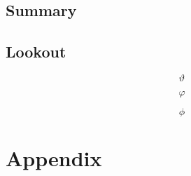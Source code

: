 	\section{Summary}
	\section{Lookout}
	\newpage
	\begin{equation*}
		\vartheta
	\end{equation*}

	\begin{equation*}
		\varphi
	\end{equation*}

	\begin{equation*}
		\phi
	\end{equation*}
		
	\appendix
	\chapter{Appendix}	
